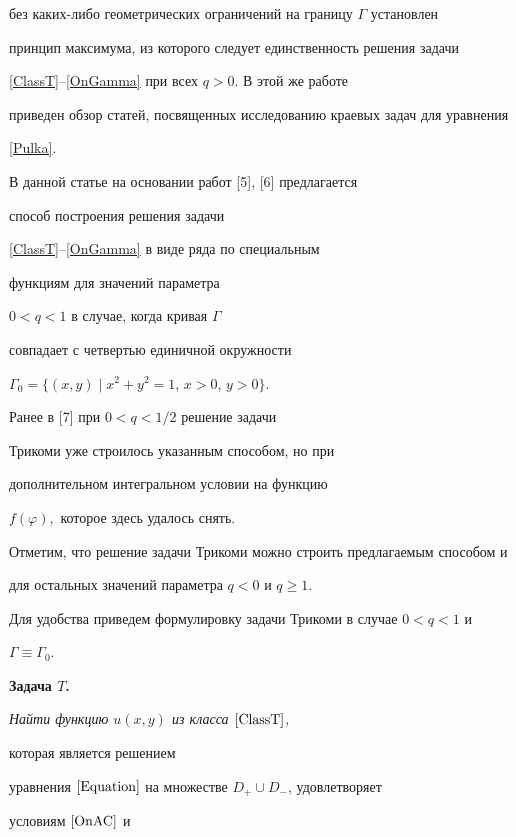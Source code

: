 без каких-либо геометрических ограничений на границу $\Gamma$ установлен 


принцип максимума, из которого следует единственность решения задачи


\eqref{ClassT}--\eqref{OnGamma} при всех $q>0$. В этой же работе


приведен обзор статей, посвященных исследованию краевых задач для уравнения


\eqref{Pulka}.





В данной статье на основании работ [5], [6] предлагается


способ построения решения задачи


\eqref{ClassT}--\eqref{OnGamma} в виде ряда по специальным


функциям для значений параметра


$0<q<1$ в случае, когда кривая $\Gamma$


совпадает с четвертью единичной окружности


$\Gamma_{0}=\{(x,y)\mid x^2+y^2=1$, $x>0$, $y>0\}$.


Ранее в [7] при $0<q<1/2$ решение задачи


Трикоми уже строилось указанным способом, но при


дополнительном интегральном условии на функцию


$f(\varphi),$ которое здесь удалось снять.





Отметим, что решение задачи Трикоми можно строить предлагаемым способом и 


для остальных значений параметра $q<0$ и $q\geq 1$.





Для удобства приведем формулировку задачи Трикоми в случае $0<q<1$ и


$\Gamma\equiv\Gamma_{0}$.


\medskip





{\bf Задача $T$.} {\it Найти функцию $u(x,y)$ из класса $\eqref{ClassT}$,


которая является решением


уравнения $\eqref{Equation}$ на множестве $D_+\cup D_-$, удовлетворяет 


условиям $\eqref{OnAC}$ и}


